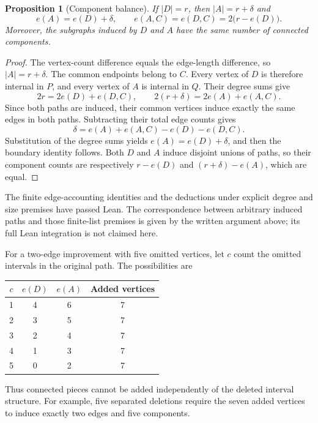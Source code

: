 \documentclass[11pt,a4paper]{article}
\newtheorem{proposition}[theorem]{Proposition}
\theoremstyle{definition}
\theoremstyle{remark}
\begin{document}
\begin{proposition}[Component balance]
If $|D|=r$, then $|A|=r+\delta$ and
\[
\boxed{e(A)=e(D)+\delta,\qquad
e(A,C)=e(D,C)=2\bigl(r-e(D)\bigr).}
\]
Moreover, the subgraphs induced by $D$ and $A$ have the same number
of connected components.
\end{proposition}
\begin{proof}
The vertex-count difference equals the edge-length difference, so
$|A|=r+\delta$. The common endpoints belong to $C$. Every vertex of
$D$ is therefore internal in $P$, and every vertex of $A$ is internal
in $Q$. Their degree sums give
\[
2r=2e(D)+e(D,C),\qquad
2(r+\delta)=2e(A)+e(A,C).
\]
Since both paths are induced, their common vertices induce exactly
the same edges in both paths. Subtracting their total edge counts gives
\[
\delta=e(A)+e(A,C)-e(D)-e(D,C).
\]
Substitution of the degree sums yields $e(A)=e(D)+\delta$, and then
the boundary identity follows. Both $D$ and $A$ induce disjoint unions
of paths, so their component counts are respectively
$r-e(D)$ and $(r+\delta)-e(A)$, which are equal.
\end{proof}
The finite edge-accounting identities and the deductions under explicit
degree and size premises have passed Lean. The correspondence between
arbitrary induced paths and those finite-list premises is given by the
written argument above; its full Lean integration is not claimed here.

For a two-edge improvement with five omitted vertices, let $c$ count
the omitted intervals in the original path. The possibilities are
\begin{center}
\begin{tabular}{cccc}
\toprule
$c$ & $e(D)$ & $e(A)$ & Added vertices\\
\midrule
1 & 4 & 6 & 7\\
2 & 3 & 5 & 7\\
3 & 2 & 4 & 7\\
4 & 1 & 3 & 7\\
5 & 0 & 2 & 7\\
\bottomrule
\end{tabular}
\end{center}
Thus connected pieces cannot be added independently of the deleted
interval structure. For example, five separated deletions require the
seven added vertices to induce exactly two edges and five components.
\end{document}

